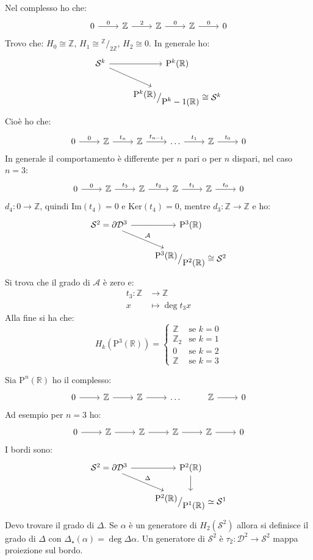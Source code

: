 \documentclass[10pt, twoside=false, x11names]{scrbook}
\newcommand{\Z}{\mathbb{Z}}
\newcommand{\im}[1]{\mathrm{Im}( #1 )}
\renewcommand{\ker}[1]{\mathrm{Ker}( #1)}
\newcommand{\Pjr}[1]{\mathrm{P}^#1 (\mathbb{R})}
\newcommand{\Sph}[1][]{\mathcal{S}^#1}
\newcommand{\Disk}[1][]{\mathcal{D}^#1}
\newcommand*\quot[2]{{^{\textstyle #1}\big/_{\textstyle #2}}}
\begin{document}
Nel complesso ho che:
\[
  \begin{tikzcd}
    0 \rar{0} & \Z \rar{2} & \Z \rar{0} & \Z \rar{0} & 0
  \end{tikzcd}
\]
Trovo che: $ H_0 \cong \Z $, $ H_1 \cong \quot{\Z}{2 \Z} $, $ H_2 \cong 0 $.
In generale ho:
\[
  \begin{tikzcd}
    \Sph{k} \rar \arrow{rd}{} & \Pjr{k} \\
    {} & \quot{\Pjr{k}}{\Pjr{k-1}} \cong \Sph{k}
  \end{tikzcd}
\]
Cioè ho che:
\[
  \begin{tikzcd}
    0 \rar{0} & \Z \rar{t_n} & \Z \rar{t_{n-1}} & \dots \rar{t_1 }& \Z \rar{t_0} & 0
  \end{tikzcd}
\]
In generale il comportamento è differente per $ n $ pari o per $ n $
dispari, nel caso $ n = 3 $:
\[
  \begin{tikzcd}
    0 \rar{0} & \Z \rar{t_3} & \Z \rar{t_{2}} & \Z \rar{t_1}& \Z \rar{t_0} & 0
  \end{tikzcd}
\]
$ d_4 \colon 0 \to \Z $, quindi $ \im{t_4} = 0 $ e $ \ker{t_4} = 0 $,
mentre $ d_3 \colon \Z \to \Z $ e ho:
\[
  \begin{tikzcd}
    \Sph{2} = \partial \Disk{3} \rar \arrow{rd}{\mathcal{A}} & \Pjr{3} \\
    {} & \quot{\Pjr{3}}{\Pjr{2}} \cong \Sph{2}
  \end{tikzcd}
\]
Si trova che il grado di $ \mathcal{A} $ è zero e:
\begin{align*}
  t_3 \colon \Z & \to \Z \\
  x & \mapsto \deg{t_3} x
\end{align*}
Alla fine si ha che:
\[
  H_k(\Pjr{3}) =
  \begin{cases}
    \Z & \text{se } k = 0 \\
    \Z_2 & \text{se } k = 1 \\
    0 & \text{se } k = 2 \\
    \Z & \text{se } k = 3
  \end{cases}
\]

Sia $ \Pjr{n} $ ho il complesso:
\[
  \begin{tikzcd}
    0 \rar & \Z \rar & \Z \rar & \dots & \Z \rar & 0
  \end{tikzcd}
\]
Ad esempio per $ n = 3 $ ho:
\[
  \begin{tikzcd}
    0 \rar & \Z \rar & \Z \rar & \Z \rar  & \Z \rar & 0
  \end{tikzcd}
\]
I bordi sono:
\[
  \begin{tikzcd}
    \Sph{2} = \partial \Disk{3} \rar \arrow{dr}{\Delta} & \Pjr{2} \dar \\
    {} & \quot{\Pjr{2}}{\Pjr{1}} \simeq \Sph{1}
  \end{tikzcd}
\]
Devo trovare il grado di $ \Delta $. Se $ \alpha $ è un generatore di
$ H_2(\Sph{2}) $ allora si definisce il grado di $ \Delta $ con
$ \Delta_\star(\alpha) = \deg{\Delta} \alpha $. Un generatore di $ \Sph{2} $ è
$ \tau_2 \colon \Disk{2} \to \Sph{2} $ mappa proiezione sul bordo.
\end{document}
